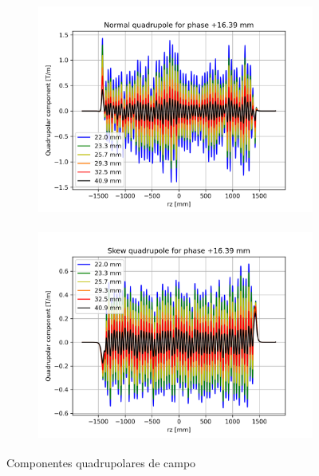 \documentclass[a4paper,12pt]{article}
\begin{document}
\begin{figure}[H]
\begin{subfigure}{0.5\textwidth}
\includegraphics[width=0.9\linewidth, height=7cm]{figs/phase16 Normal quadrupole.png} 
\label{fig:subim116q}
\end{subfigure}
\begin{subfigure}{0.5\textwidth}
\includegraphics[width=0.9\linewidth, height=7cm]{figs/phase16 Skew quadrupole.png}
\label{fig:subim216q}
\end{subfigure}
\caption{Componentes quadrupolares de campo}
\label{fig:quad16}
\end{figure}
\end{document}
